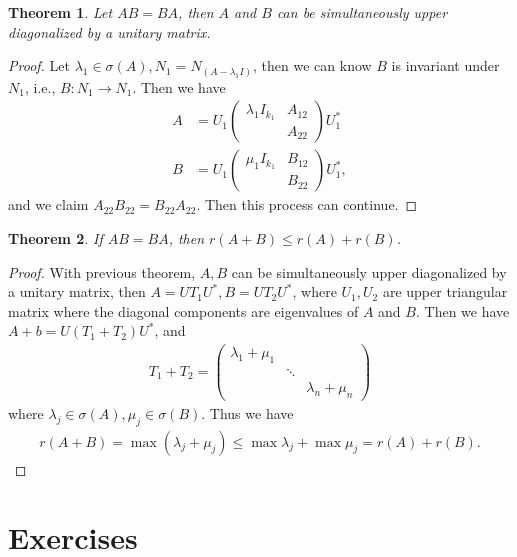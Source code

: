\documentclass[11pt]{book}
\newtheorem{theorem}{Theorem}[section]
\theoremstyle{definition}
\numberwithin{equation}{subsection}
\begin{document}
\medskip

\begin{theorem}
Let $AB = BA$, then $A$ and $B$ can be simultaneously upper diagonalized by a unitary matrix.
\end{theorem}
\begin{proof}
Let $\lambda_1\in\sigma(A), N_1 = N_{(A - \lambda_1 I)}$, then we can know $B$ is invariant under $N_1$, i.e., $B:N_1\to N_1$. Then we have 
\begin{align*}
    A & = U_1 \begin{pmatrix}
    \lambda_1 I_{k_1} & A_{12} \\
     & A_{22}
    \end{pmatrix} U_1^* \\
    B & = U_1 \begin{pmatrix}
    \mu_1 I_{k_1} & B_{12} \\
     & B_{22}
    \end{pmatrix} U_1^*,
\end{align*}
and we claim $A_{22}B_{22} = B_{22}A_{22}$. Then this process can continue.
\end{proof}

\medskip

\begin{theorem}
If $AB = BA$, then $r(A+B)\leq r(A)+r(B)$.
\end{theorem}
\begin{proof}
With previous theorem, $A,B$ can be simultaneously upper diagonalized by a unitary matrix, then $A = UT_1U^*, B = UT_2U^*$, where $U_1, U_2$ are upper triangular matrix where the diagonal components are eigenvalues of $A$ and $B$. Then we have
$A+b = U(T_1+T_2)U^*$, and 
\begin{align*}
    T_1+T_2 = \begin{pmatrix}
    \lambda_1 + \mu_1 &  &  \\
     & \ddots &  \\
     &  & \lambda_n + \mu_n
    \end{pmatrix}
\end{align*}
where $\lambda_j\in\sigma(A), \mu_j\in\sigma(B)$. Thus we have
\begin{align*}
    r(A+B) = \max (\lambda_j + \mu_j) \leq \max \lambda_j + \max \mu_j = r(A)+r(B).
\end{align*}
\end{proof}

\medskip

\section{Exercises}
\end{document}
